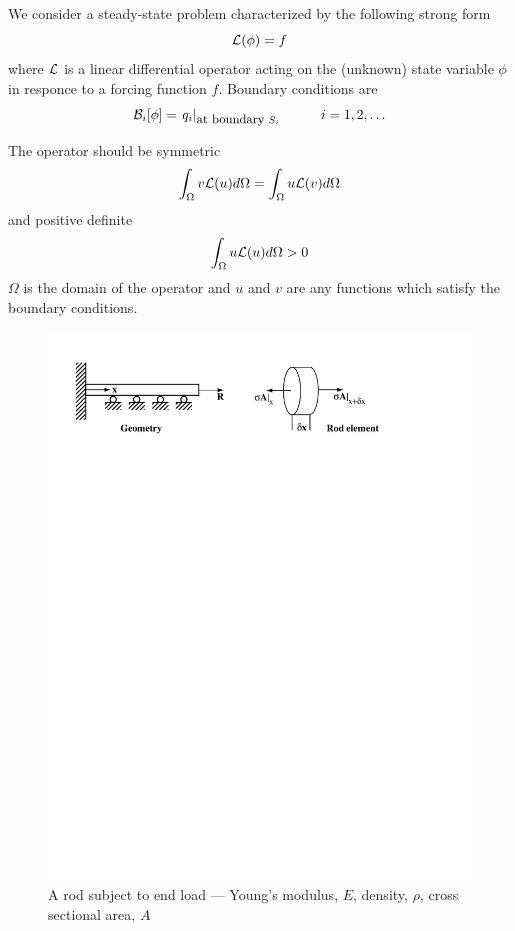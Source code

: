 \documentclass[10pt]{article}
\begin{document}
	We consider a steady-state problem characterized by the following 
	strong form
		\begin{equation}
			{\cal{L}} (\phi) = f
		\end{equation}		
	where ${\cal{L}}$ is a linear differential operator acting on the 
	(unknown) state variable $\phi$ in responce to a forcing function $f$.
	Boundary conditions are
		\begin{equation}
			{\cal{B}}_i [\phi] = \left. q_i \right|_{\mbox{\small at boundary } S_i}    \mbox{\hspace{1cm}} i=1,2,\ldots
		\end{equation}

	The operator should be symmetric 
		\begin{equation}
			\int_\Omega v {\cal{L}}(u) d\Omega =  \int_\Omega u {\cal{L}}(v) d\Omega 
		\end{equation}
	 and positive definite
	 	\begin{equation}
	 		\int_\Omega u {\cal{L}}(u) d\Omega > 0
	 	\end{equation}
	 $\Omega$ is the domain of the operator and $u$ and $v$ are any functions
	 which satisfy the boundary conditions.	
	 
			\begin{figure}[h]           
				\begin{center}
		 			 \includegraphics[width=0.66\linewidth]{Diagrams/rodpull.pdf}
		 			\caption[]{A rod subject to end load --- Young's modulus, $E$, density, $\rho$,
		 			cross sectional area, $A$}
		 			\label{fig:rod1}
		 		\end{center}
			\end{figure}
	 
\end{document}

